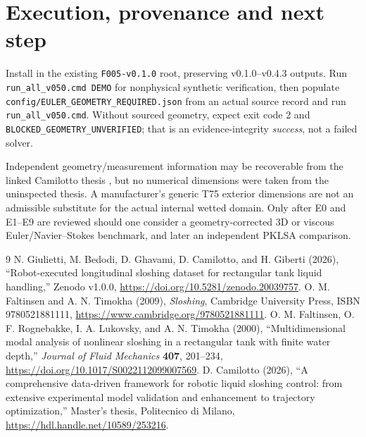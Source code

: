 \documentclass[11pt,a4paper]{article}
\begin{document}
\section{Execution, provenance and next step}
Install in the existing \texttt{F005-v0.1.0} root, preserving v0.1.0--v0.4.3 outputs. Run \texttt{run\_all\_v050.cmd DEMO} for nonphysical synthetic verification, then populate \texttt{config/EULER\_GEOMETRY\_REQUIRED.json} from an actual source record and run \texttt{run\_all\_v050.cmd}. Without sourced geometry, expect exit code 2 and \texttt{BLOCKED\_GEOMETRY\_UNVERIFIED}; that is an evidence-integrity \emph{success}, not a failed solver.

Independent geometry/measurement information may be recoverable from the linked Camilotto thesis \cite{Camilotto2026}, but no numerical dimensions were taken from the uninspected thesis. A manufacturer's generic T75 exterior dimensions are not an admissible substitute for the actual internal wetted domain. Only after E0 and E1--E9 are reviewed should one consider a geometry-corrected 3D or viscous Euler/Navier--Stokes benchmark, and later an independent PKLSA comparison.

\begin{thebibliography}{9}
 N. Giulietti, M. Bedodi, D. Ghavami, D. Camilotto, and H. Giberti (2026), ``Robot-executed longitudinal sloshing dataset for rectangular tank liquid handling,'' Zenodo v1.0.0, \url{https://doi.org/10.5281/zenodo.20039757}.
 O. M. Faltinsen and A. N. Timokha (2009), \emph{Sloshing}, Cambridge University Press, ISBN 9780521881111, \url{https://www.cambridge.org/9780521881111}.
 O. M. Faltinsen, O. F. Rognebakke, I. A. Lukovsky, and A. N. Timokha (2000), ``Multidimensional modal analysis of nonlinear sloshing in a rectangular tank with finite water depth,'' \emph{Journal of Fluid Mechanics} \textbf{407}, 201--234, \url{https://doi.org/10.1017/S0022112099007569}.
 D. Camilotto (2026), ``A comprehensive data-driven framework for robotic liquid sloshing control: from extensive experimental model validation and enhancement to trajectory optimization,'' Master's thesis, Politecnico di Milano, \url{https://hdl.handle.net/10589/253216}.
\end{thebibliography}
\end{document}
